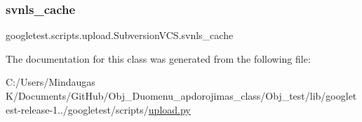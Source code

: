 \mbox{\label{classgoogletest_1_1scripts_1_1upload_1_1_subversion_v_c_s_a443158dadce973c1fc49900b37f848f7}} 
\subsubsection{\texorpdfstring{svnls\_cache}{svnls\_cache}}
{\footnotesize\ttfamily googletest.\+scripts.\+upload.\+Subversion\+V\+C\+S.\+svnls\+\_\+cache}



The documentation for this class was generated from the following file\+:\begin{DoxyCompactItemize}
\item 
C\+:/\+Users/\+Mindaugas K/\+Documents/\+Git\+Hub/\+Obj\+\_\+\+Duomenu\+\_\+apdorojimas\+\_\+class/\+Obj\+\_\+test/lib/googletest-\/release-\/1../googletest/scripts/\mbox{\hyperlink{_obj__test_2lib_2googletest-release-1_88_81_2googletest_2scripts_2upload_8py}{upload.\+py}}\end{DoxyCompactItemize}
